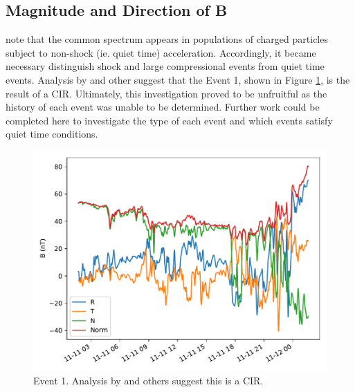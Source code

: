 \documentclass[letterpaper,11pt]{article}
\begin{document}
\subsection{Magnitude and Direction of B}
\citet{Fisk2008} note that the common spectrum appears in populations of charged particles subject to non-shock (ie. quiet time) acceleration.  Accordingly, it became necessary distinguish shock and large compressional events from quiet time events.  Analysis by \citet{Cohen2020} and other suggest that the Event 1, shown in Figure \ref{fig:b_rtn_01}, is the result of a CIR.  Ultimately, this investigation proved to be unfruitful as the history of each event was unable to be determined.  Further work could be completed here to investigate the type of each event and which events satisfy quiet time conditions.


\begin{figure}[htbp]
\centering
\includegraphics[width=0.75\linewidth]{figures/B_RTN_01.pdf}
\caption{Event 1. Analysis by \citet{Cohen2020} and others suggest this is a CIR.}
\label{fig:b_rtn_01}
\end{figure}
\end{document}
